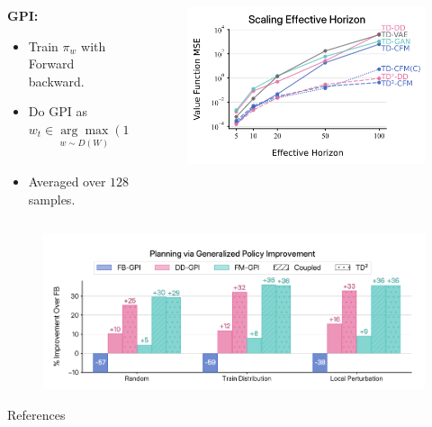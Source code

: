 \documentclass{beamer}
\begin{document}
\begin{frame}
    \begin{columns}
    \begin{column}{0.6\linewidth}
        \textbf{GPI:}
        \begin{itemize}
        \footnotesize
        \item Train \( \pi_w \) with Forward backward.
        \item Do GPI as $w_t \in \underset{w \sim D(W)}{\arg \max} \underbrace{(1 - \gamma)^{-1} \mathbb{E}_{X \sim m^{\pi_w}(\cdot | s_t, \pi_w(s_t)))}[r(X)]}_{Q^{\pi_w}(s_t, \pi_w(s_t))}.$
        \item Averaged over \( 128 \) samples.
        \end{itemize}
    \end{column}
    \begin{column}{0.4\linewidth}
    \begin{figure}
        \includegraphics[width=\linewidth]{figures/horizon-td-flow.png}
    \end{figure}
    \end{column}
    \end{columns}
    \begin{figure}
        \includegraphics[width=\linewidth]{figures/fm-gpi.png}
    \end{figure}
\end{frame}


\begin{frame}{References}
    \footnotesize
    
    
\end{frame}
\end{document}
